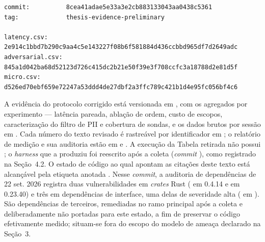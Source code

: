 \begin{apendicesenv}
\begingroup
\footnotesize
\begin{verbatim}
commit:          8cea41adae5e33a3e2cb883133043aa0438c5361
tag:             thesis-evidence-preliminary

latency.csv:     2e914c1bbd7b290c9aa4c5e143227f08b6f581884d436ccbbd965df7d2649adc
adversarial.csv: 845a1d042ba68d52123d726c415dc2b21e50f39e3f708ccfc3a18788d2e81d5f
micro.csv:       d526ed70ebf659e72247a53ddd4de27dbf2a3ffc789c421b1d4e95fc056bf4c6
\end{verbatim}
\endgroup

{\sloppy A evidência do protocolo corrigido está versionada em , com os agregados por experimento --- latência pareada, ablação de ordem, custo de escopos, caracterização do filtro de PII e cobertura de sondas, e os dados brutos por sessão em . Cada número do texto revisado é rastreável por identificador em ; o relatório de medição e sua auditoria estão em  e . A execução da Tabela retirada não possui ; o \textit{harness} que a produziu foi reescrito após a coleta (\textit{commit} ), como registrado na Seção~4.2. O estado de código ao qual apontam as citações  deste texto está alcançável pela etiqueta anotada . Nesse \textit{commit}, a auditoria de dependências de 22 set. 2026 registra duas vulnerabilidades em \textit{crates} Rust ( em  0.4.14 e  em  0.23.40) e três em dependências de interface, uma delas de severidade alta ( em ). São dependências de terceiros, remediadas no ramo principal após a coleta e deliberadamente não portadas para este estado, a fim de preservar o código efetivamente medido; situam-se fora do escopo do modelo de ameaça declarado na Seção~3.\par}
\end{apendicesenv}

